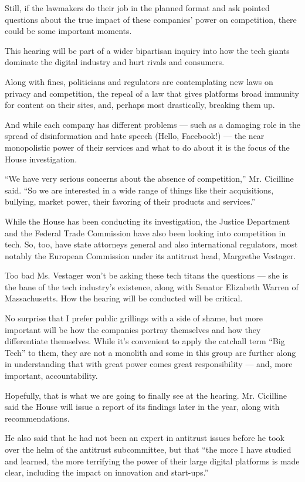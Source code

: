 Still, if the lawmakers do their job in the planned format and ask
pointed questions about the true impact of these companies' power on
competition, there could be some important moments.

This hearing will be part of a wider bipartisan inquiry into how the
tech giants dominate the digital industry and hurt rivals and consumers.

Along with fines, politicians and regulators are contemplating new laws
on privacy and competition, the repeal of a law that gives platforms
broad immunity for content on their sites, and, perhaps most
drastically, breaking them up.

And while each company has different problems --- such as a damaging
role in the spread of disinformation and hate speech (Hello, Facebook!)
--- the near monopolistic power of their services and what to do about
it is the focus of the House investigation.

``We have very serious concerns about the absence of competition,'' Mr.
Cicilline said. ``So we are interested in a wide range of things like
their acquisitions, bullying, market power, their favoring of their
products and services.''

While the House has been conducting its investigation, the Justice
Department and the Federal Trade Commission have also been looking into
competition in tech. So, too, have state attorneys general and also
international regulators, most notably the European Commission under its
antitrust head, Margrethe Vestager.

Too bad Ms. Vestager won't be asking these tech titans the questions ---
she is the bane of the tech industry's existence, along with Senator
Elizabeth Warren of Massachusetts. How the hearing will be conducted
will be critical.

No surprise that I prefer public grillings with a side of shame, but
more important will be how the companies portray themselves and how they
differentiate themselves. While it's convenient to apply the catchall
term ``Big Tech'' to them, they are not a monolith and some in this
group are further along in understanding that with great power comes
great responsibility --- and, more important, accountability.

Hopefully, that is what we are going to finally see at the hearing. Mr.
Cicilline said the House will issue a report of its findings later in
the year, along with recommendations.

He also said that he had not been an expert in antitrust issues before
he took over the helm of the antitrust subcommittee, but that ``the more
I have studied and learned, the more terrifying the power of their large
digital platforms is made clear, including the impact on innovation and
start-ups.''

